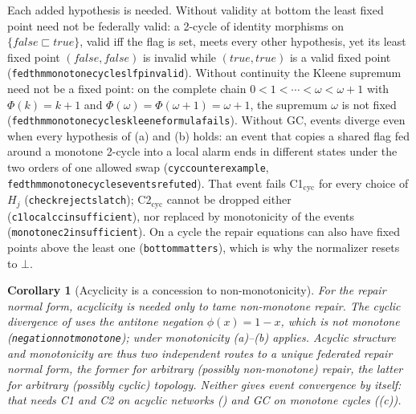 \documentclass[11pt,a4paper]{article}
\theoremstyle{plain}
\newtheorem{corollary}[theorem]{Corollary}
\theoremstyle{definition}
\theoremstyle{remark}
\renewcommand{\_}{\textunderscore\allowbreak}
\begin{document}
Each added hypothesis is needed.  Without validity at bottom the least fixed
point need not be federally valid: a 2-cycle of identity morphisms on
$\{\mathit{false} \sqsubset \mathit{true}\}$, valid iff the flag is set, meets
every other hypothesis, yet its least fixed point $(\mathit{false},
\mathit{false})$ is invalid while $(\mathit{true}, \mathit{true})$ is a valid
fixed point (\texttt{fed\_thm\_monotone\_cycles\_lfp\_invalid}).  Without
continuity the Kleene supremum need not be a fixed point: on the complete chain
$0 < 1 < \cdots < \omega < \omega{+}1$ with $\Phi(k) = k{+}1$ and
$\Phi(\omega) = \Phi(\omega{+}1) = \omega{+}1$, the supremum $\omega$ is not
fixed (\texttt{fed\_thm\_monotone\_cycles\_kleene\_formula\_fails}).  Without
GC, events diverge even when every hypothesis of (a) and (b) holds: an event
that copies a shared flag fed around a monotone 2-cycle into a local alarm ends
in different states under the two orders of one allowed swap
(\texttt{cyc\_counterexample}, \texttt{fed\_thm\_monotone\_cycles\_events\_refuted}).
That event fails C1$_{\mathrm{cyc}}$ for every choice of $H_j$
(\texttt{check\_rejects\_latch}); C2$_{\mathrm{cyc}}$ cannot be dropped either
(\texttt{c1\_localcc\_insufficient}), nor replaced by monotonicity of the events
(\texttt{monotone\_c2\_insufficient}).  On a cycle the repair equations can
also have fixed points above the least one (\texttt{bottom\_matters}), which is
why the normalizer resets to $\bot$.

\begin{corollary}[Acyclicity is a concession to non-monotonicity]
\label{cor:acyclicity-monotone}
For the repair normal form, acyclicity is needed only to tame non-monotone
repair.  The cyclic divergence of  uses the antitone
negation $\phi(x) = 1-x$, which is not monotone
(\texttt{negation\_not\_monotone}); under monotonicity
(a)--(b) applies.  Acyclic structure and monotonicity
are thus two independent routes to a unique federated repair normal form, the
former for arbitrary (possibly non-monotone) repair, the latter for arbitrary
(possibly cyclic) topology.  Neither gives event convergence by itself: that
needs C1 and C2 on acyclic networks ()
and GC on monotone cycles ((c)).
\end{corollary}
\end{document}
